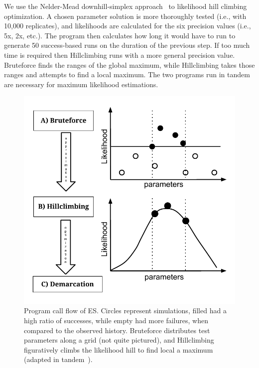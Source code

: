 We use the Nelder-Mead downhill-simplex approach~\cite{nelder1965simplex} to likelihood hill climbing optimization.
A chosen parameter solution is more thoroughly tested (i.e., with 10,000 replicates), and likelihoods are calculated for the six precision values (i.e., 5x, 2x, etc.).
The program then calculates how long it would have to run to generate 50 success-based runs on the duration of the previous step.
If too much time is required then Hillclimbing runs with a more general precision value.
Bruteforce finds the ranges of the global maximum, while Hillclimbing takes those ranges and attempts to find a local maximum.
The two programs run in tandem are necessary for maximum likelihood estimations.


\begin{figure}[h!]
 \centering
 \includegraphics[scale=0.75]{images/ESFlow-CH2.pdf}
 \caption[Ecotype Simulation program flow diagram.]{Program call flow of ES. Circles represent simulations, filled had a high ratio of successes, while empty had more failures, when compared to the observed history. Bruteforce distributes test parameters along a grid (not quite pictured), and Hillclimbing figuratively climbs the likelihood hill to find local a maximum (adapted in tandem~\protect\cite{lingThesis}).}
 \label{fig:Flow}
\end{figure}

